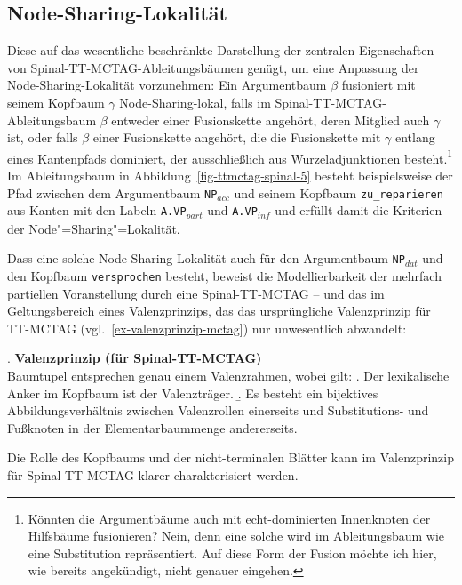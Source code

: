 \subsection{Node-Sharing-Lokalität}

Diese auf das wesentliche beschränkte Darstellung der zentralen Eigenschaften von Spinal-TT-MCTAG-Ableitungsbäumen genügt, um eine Anpassung der Node-Sharing-Lokalität vorzunehmen: Ein Argumentbaum $\beta$ fusioniert mit seinem Kopfbaum $\gamma$ Node-Sharing-lokal, falls im Spinal-TT-MCTAG-Ablei\-tungs\-baum $\beta$ entweder einer Fusionskette angehört, deren Mitglied auch $\gamma$ ist, oder falls $\beta$ einer Fusionskette angehört, die die Fusionskette mit $\gamma$ entlang eines Kantenpfads dominiert, der ausschlie\ss lich aus Wurzeladjunktionen besteht.\footnote{Könnten die Argumentbäume auch mit echt-dominierten Innenknoten der Hilfsbäume fusionieren? Nein, denn eine solche  wird im Ableitungsbaum wie eine Substitution repräsentiert. Auf diese Form der Fusion möchte ich hier, wie bereits angekündigt, nicht genauer eingehen.} Im Ableitungsbaum in Abbildung~\ref{fig-ttmctag-spinal-5} besteht beispielsweise der Pfad zwischen dem Argumentbaum {\tt NP$_{\mathit{acc}}$} und seinem Kopfbaum {\tt zu\_reparieren} aus Kanten mit den Labeln {\tt A.VP$_{\mathit{part}}$} und {\tt A.VP$_{\mathit{inf}}$} und erfüllt damit die Kriterien der Node"=Sharing"=Lokalität. 

Dass eine solche Node-Sharing-Lokalität auch für den Argumentbaum {\tt NP$_{\mathit{dat}}$} und den Kopfbaum {\tt versprochen} besteht, beweist die Modellierbarkeit der mehrfach partiellen Voranstellung durch eine Spinal-TT-MCTAG -- und das im Geltungsbereich eines Valenzprinzips, das das ursprüngliche Valenzprinzip für TT-MCTAG (vgl.\ \ref{ex-valenzprinzip-mctag}) nur unwesentlich abwandelt:

\ex. \label{ex-valenzprinzip-spinal-tt-mctag}{\bf Valenzprinzip (für Spinal-TT-MCTAG)} \\ 
Baumtupel entsprechen genau einem Valenzrahmen, wobei gilt:
\a. Der lexikalische Anker im Kopfbaum ist der Valenzträger.
\b. Es besteht ein bijektives Abbildungsverhältnis zwischen Valenzrollen einerseits und Substitutions- und Fu\ss knoten in der Elementarbaummenge andererseits.

Die Rolle des Kopfbaums und der nicht-terminalen Blätter kann im Valenzprinzip für Spinal-TT-MCTAG klarer charakterisiert werden.


